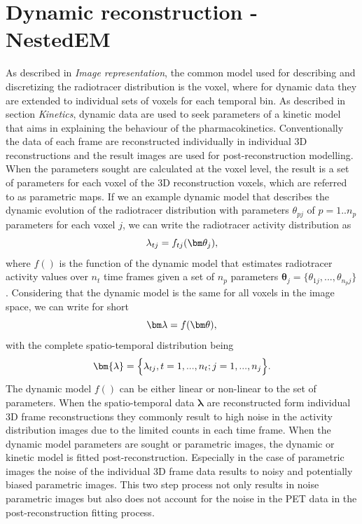 \section{Dynamic reconstruction - NestedEM}
As described in \textit{Image representation}, the common model used for describing and discretizing the radiotracer distribution is the voxel, where for dynamic data they are extended to individual sets of voxels for each temporal bin. 
As described in section \textit{Kinetics}, dynamic data are used to seek parameters of a kinetic model that aims in explaining the behaviour of the pharmacokinetics. Conventionally the data of each frame are reconstructed individually in individual 3D reconstructions and the result images are used for post-reconstruction modelling. When the parameters sought are calculated at the voxel level, the result is a set of parameters for each voxel of the 3D reconstruction voxels, which are referred to as parametric maps. If we an example dynamic model that describes the dynamic evolution of the radiotracer distribution with parameters $\theta_{pj}$ of $p=1..n_p$ parameters for each voxel $j$, we can write the radiotracer activity distribution as 
\begin{equation}
   \lambda_{tj} = f_{tj}(\bm\theta_{j}) \\,
\end{equation}
where $f()$ is the function of the dynamic model that estimates radiotracer activity values over $n_t$ time frames given a set of $n_{p}$ parameters $\bm\theta_{j} =  \Big\{\theta_{1j},...,\theta_{n_{p}j} \Big\}$.
Considering that the dynamic model is the same for all voxels in the image space, we can write for short 
\begin{equation}
\bm\lambda = f(\bm\theta) \\, 
\end{equation}
with the complete spatio-temporal distribution being 
\begin{equation}
   \bm{\lambda} = \Big\{ {{\lambda}_{tj},t=1,...,n_t ; j=1,...,n_j} \Big\} \\. 
\end{equation}
The dynamic model $f()$ can be either linear or non-linear to the set of parameters. 
When the spatio-temporal data $\bm{\lambda}$ are reconstructed form individual 3D frame reconstructions they commonly result to high noise in the activity distribution images due to the limited counts in each time frame. When  the dynamic model parameters are sought or parametric images, the dynamic or kinetic model is fitted post-reconstruction. Especially in the case of parametric images the noise of the individual 3D frame data results to noisy and potentially biased parametric images. This two step process not only results in noise parametric images but also does not account for the noise in the PET data in the post-reconstruction fitting process. 
